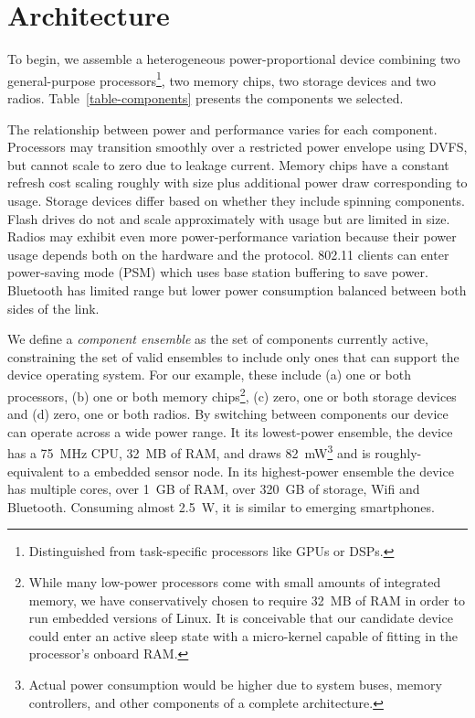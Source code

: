 \section{Architecture}
\label{section-architecture}



To begin, we assemble a heterogeneous power-proportional device combining two
general-purpose processors\footnote{Distinguished from task-specific
processors like GPUs or DSPs.}, two memory chips, two storage devices and two
radios. Table~\ref{table-components} presents the components we selected.

The relationship between power and performance varies for each component.
Processors may transition smoothly over a restricted power envelope using
DVFS, but cannot scale to zero due to leakage current. Memory chips have a
constant refresh cost scaling roughly with size plus additional power draw
corresponding to usage. Storage devices differ based on whether they include
spinning components. Flash drives do not and scale approximately with usage
but are limited in size. Radios may exhibit even more power-performance
variation because their power usage depends both on the hardware and the
protocol. 802.11 clients can enter power-saving mode (PSM) which uses base
station buffering to save power. Bluetooth has limited range but lower power
consumption balanced between both sides of the link.

We define a \textit{component ensemble} as the set of components currently
active, constraining the set of valid ensembles to include only ones that can
support the device operating system. For our example, these include (a) one
or both processors, (b) one or both memory chips\footnote{While many
low-power processors come with small amounts of integrated memory, we have
conservatively chosen to require 32~MB of RAM in order to run embedded
versions of Linux. It is conceivable that our candidate device could enter an
active sleep state with a micro-kernel capable of fitting in the processor's
onboard RAM.}, (c) zero, one or both storage devices and (d) zero, one or
both radios. By switching between components our device can operate across a
wide power range. It its lowest-power ensemble, the device has a 75~MHz CPU,
32~MB of RAM, and draws 82~mW\footnote{Actual power consumption would be
higher due to system buses, memory controllers, and other components of a
complete architecture.} and is roughly-equivalent to a embedded sensor node.
In its highest-power ensemble the device has multiple cores, over 1~GB of
RAM, over 320~GB of storage, Wifi and Bluetooth. Consuming almost 2.5~W, it
is similar to emerging smartphones.

